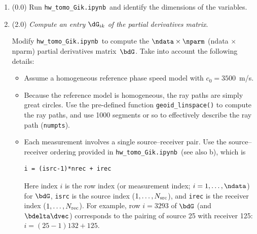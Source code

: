 \documentclass[11pt,titlepage,fleqn]{article}
\newcommand{\tfileGik}{{\tt hw\_tomo\_Gik.ipynb}}
\begin{document}
\begin{enumerate}
\begin{enumerate}
\item (0.5) Show how  can be expressed as
%
\begin{equation}
\bdelta\dvec = \bdG\,\bdelta\bem,
\end{equation}
%
where the data vector is given by
%
\begin{equation}
\bdelta\dvec = (\delta T_1,\ldots,\delta T_i,\ldots,\delta T_\ndata)^T,
\label{d}
\end{equation}
%
and the model vector is given by
%
\begin{equation}
\bdelta\bem = (\delta m_1,\ldots,\delta m_k,\ldots,\delta m_\nparm)^T,
\label{m}
\end{equation}
%
Write your final equation in matrix-vector schematic form, as done in \verb+lab_linefit+ (line) and \verb+hw_inv+ (ellipse).

Write the expression for the $\dG_{ik}$ entry of the partial derivatives matrix~$\bdG$.
\end{enumerate}


\item (0.0) Run \tfileGik\ and identify the dimensions of the variables.


\item (2.0) {\em Compute an entry $\dG_{ik}$ of the partial derivatives matrix}. 

Modify \tfileGik\ to compute the $\ndata \times \nparm$ (ndata $\times$ nparm) partial derivatives matrix~$\bdG$.
Take into account the following details:
%
\begin{itemize}
\item Assume a homogeneous reference phase speed model with $c_0 = 3500$~m/s.

\item Because the reference model is homogeneous, the ray paths are simply great circles.  Use the pre-defined function \verb+geoid_linspace()+ to compute the ray paths, and use 1000 segments or so to effectively describe the ray path (\verb+numpts+).

\item Each measurement involves a single source--receiver pair. Use the source--receiver ordering provided in \tfileGik\ (see also b), which is
%
\begin{verbatim}
i = (isrc-1)*nrec + irec
\end{verbatim}
%
Here index $i$ is the row index (or measurement index; $i = 1,\ldots,\ndata$) for $\bdG$, \verb+isrc+ is the source index ($1, \ldots, N_{\rm src}$), and \verb+irec+ is the receiver index ($1, \ldots, N_{\rm rec}$). For example, row $i=3293$ of $\bdG$ (and $\bdelta\dvec$) corresponds to the pairing of source 25 with receiver 125: $i=(25-1)132 + 125$.


\end{itemize}
\end{enumerate}
\end{document}
